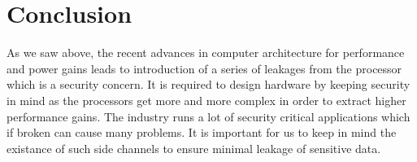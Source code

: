 
\chapter{Conclusion}

As we saw above, the recent advances in computer architecture for performance
and power gains leads to introduction of a series of leakages from the
processor which is a security concern. It is required to design hardware by
keeping security in mind as the processors get more and more complex in order
to extract higher performance gains. The industry runs a lot of
security critical applications which if broken can cause many problems. It is
important for us to keep in mind the existance of such side channels to ensure
minimal leakage of sensitive data. 
